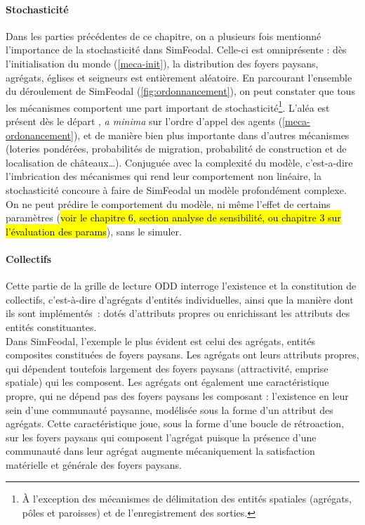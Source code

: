 \paragraph{Stochasticité} Dans les parties précédentes de ce chapitre, on a plusieurs fois mentionné l'importance de la stochasticité dans SimFeodal.
Celle-ci est omniprésente : dès l'initialisation du monde (\cref{meca-init}), la distribution des foyers paysans, agrégats, églises et seigneurs est entièrement aléatoire.
En parcourant l'ensemble du déroulement de SimFeodal (\cref{fig:ordonnancement}), on peut constater que tous les mécanismes comportent une part important de stochasticité\footnote{
	À l'exception des mécanismes de \og délimitation\fg{} des entités spatiales (agrégats, pôles et paroisses) et de l'enregistrement des sorties.
}.
L'aléa est présent dès le départ , \textit{a minima} sur l'ordre d'appel des agents (\cref{meca-ordonancement}), et de manière bien plus importante dans d'autres mécanismes (loteries pondérées, probabilités de migration, probabilité de construction et de localisation de châteaux\ldots).
Conjuguée avec la complexité du modèle, c'est-a-dire l'imbrication des mécanismes qui rend leur comportement non linéaire, la stochasticité concoure à faire de SimFeodal un modèle profondément complexe.
On ne peut prédire le comportement du modèle, ni même l'effet de certains paramètres (\hl{voir le chapitre 6, section analyse de sensibilité, ou chapitre 3 sur l'évaluation des params}), sans le simuler.

\paragraph{Collectifs} Cette partie de la grille de lecture ODD interroge l'existence et la constitution de \og collectifs\fg{}, c'est-à-dire d'agrégats d'entités individuelles, ainsi que la manière dont ils sont implémentés : dotés
d'attributs propres ou enrichissant les attributs des entités constituantes.
\\
Dans SimFeodal, l'exemple le plus évident est celui des agrégats, entités composites constituées de foyers paysans.
Les agrégats ont leurs attributs propres, qui dépendent toutefois largement des foyers paysans (attractivité, emprise spatiale) qui les composent.
Les agrégats ont également une caractéristique propre, qui ne dépend pas des foyers paysans les composant : l'existence en leur sein d'une communauté paysanne, modélisée sous la forme d'un attribut des agrégats.
Cette caractéristique joue, sous la forme d'une boucle de rétroaction, sur les foyers paysans qui composent l'agrégat puisque la présence d'une communauté dans leur agrégat augmente mécaniquement la satisfaction matérielle et générale des foyers paysans.

